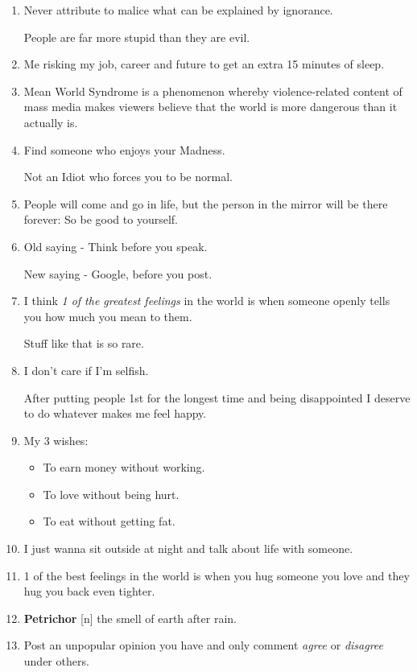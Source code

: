 \documentclass{article}
\numberwithin{equation}{section}
\begin{document}
\begin{enumerate}
    Whether it ends good or bad, it was an experience.
    \item Never attribute to malice what can be explained by ignorance.
    
    People are far more stupid than they are evil.
    \item Me risking my job, career and future to get an extra 15 minutes of sleep.
    \item Mean World Syndrome is a phenomenon whereby violence-related content of mass media makes viewers believe that the world is more dangerous than it actually is.
    \item Find someone who enjoys your Madness.
    
    Not an Idiot who forces you to be normal.
    \item People will come and go in life, but the person in the mirror will be there forever: So be good to yourself.
    \item Old saying - Think before you speak.
    
    New saying - Google, before you post.
    \item I think \textit{1 of the greatest feelings} in the world is when someone openly tells you how much you mean to them.
    
    Stuff like that is so rare.
    \item I don't care if I'm selfish.
    
    After putting people 1st for the longest time and being disappointed I deserve to do whatever makes me feel happy.
    \item My 3 wishes:
    \begin{itemize}
        \item[1.] To earn money without working.
        \item[2.] To love without being hurt.
        \item[3.] To eat without getting fat.
    \end{itemize}
    \item I just wanna sit outside at night and talk about life with someone.
    \item 1 of the best feelings in the world is when you hug someone you love and they hug you back even tighter.
    \item \textbf{Petrichor} [n] the smell of earth after rain.
    \item Post an unpopular opinion you have and only comment \textit{agree} or \textit{disagree} under others.
    

\end{enumerate}
\end{document}
